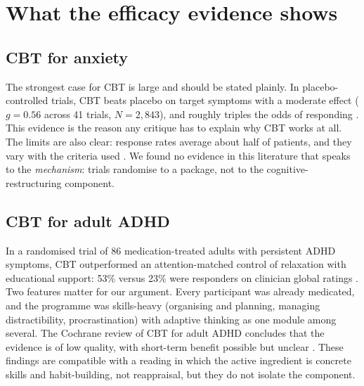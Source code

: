 \section{What the efficacy evidence shows}\label{sec:evidence}
\subsection{CBT for anxiety}
The strongest case for CBT is large and should be stated plainly. In placebo-controlled trials, CBT beats placebo on target symptoms with a moderate effect ($g=0.56$ across 41 trials, $N=2{,}843$), and roughly triples the odds of responding \citep{carpenter2018cbt}. This evidence is the reason any critique has to explain why CBT works at all. The limits are also clear: response rates average about half of patients, and they vary with the criteria used \citep{loerinc2015response}. We found no evidence in this literature that speaks to the \emph{mechanism}: trials randomise to a package, not to the cognitive-restructuring component.

\subsection{CBT for adult ADHD}
In a randomised trial of 86 medication-treated adults with persistent ADHD symptoms, CBT outperformed an attention-matched control of relaxation with educational support: 53\% versus 23\% were responders on clinician global ratings \citep{safren2010cbt}. Two features matter for our argument. Every participant was already medicated, and the programme was skills-heavy (organising and planning, managing distractibility, procrastination) with adaptive thinking as one module among several. The Cochrane review of CBT for adult ADHD concludes that the evidence is of low quality, with short-term benefit possible but unclear \citep{lopez2018cochrane}. These findings are compatible with a reading in which the active ingredient is concrete skills and habit-building, not reappraisal, but they do not isolate the component.
